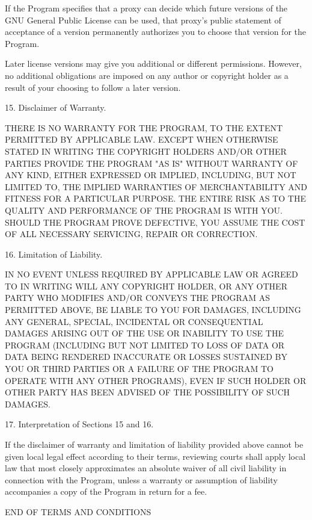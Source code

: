 \documentclass[11pt]{book}
\begin{document}
    If the Program specifies that a proxy can decide which future
    versions of the GNU General Public License can be used, that proxy's
    public statement of acceptance of a version permanently authorizes you
    to choose that version for the Program.

    Later license versions may give you additional or different
    permissions.  However, no additional obligations are imposed on any
    author or copyright holder as a result of your choosing to follow a
    later version.

    15. Disclaimer of Warranty.

    THERE IS NO WARRANTY FOR THE PROGRAM, TO THE EXTENT PERMITTED BY
    APPLICABLE LAW.  EXCEPT WHEN OTHERWISE STATED IN WRITING THE COPYRIGHT
    HOLDERS AND/OR OTHER PARTIES PROVIDE THE PROGRAM "AS IS" WITHOUT WARRANTY
    OF ANY KIND, EITHER EXPRESSED OR IMPLIED, INCLUDING, BUT NOT LIMITED TO,
    THE IMPLIED WARRANTIES OF MERCHANTABILITY AND FITNESS FOR A PARTICULAR
    PURPOSE.  THE ENTIRE RISK AS TO THE QUALITY AND PERFORMANCE OF THE PROGRAM
    IS WITH YOU.  SHOULD THE PROGRAM PROVE DEFECTIVE, YOU ASSUME THE COST OF
    ALL NECESSARY SERVICING, REPAIR OR CORRECTION.

    16. Limitation of Liability.

    IN NO EVENT UNLESS REQUIRED BY APPLICABLE LAW OR AGREED TO IN WRITING
    WILL ANY COPYRIGHT HOLDER, OR ANY OTHER PARTY WHO MODIFIES AND/OR CONVEYS
    THE PROGRAM AS PERMITTED ABOVE, BE LIABLE TO YOU FOR DAMAGES, INCLUDING ANY
    GENERAL, SPECIAL, INCIDENTAL OR CONSEQUENTIAL DAMAGES ARISING OUT OF THE
    USE OR INABILITY TO USE THE PROGRAM (INCLUDING BUT NOT LIMITED TO LOSS OF
    DATA OR DATA BEING RENDERED INACCURATE OR LOSSES SUSTAINED BY YOU OR THIRD
    PARTIES OR A FAILURE OF THE PROGRAM TO OPERATE WITH ANY OTHER PROGRAMS),
    EVEN IF SUCH HOLDER OR OTHER PARTY HAS BEEN ADVISED OF THE POSSIBILITY OF
    SUCH DAMAGES.

    17. Interpretation of Sections 15 and 16.

    If the disclaimer of warranty and limitation of liability provided
    above cannot be given local legal effect according to their terms,
    reviewing courts shall apply local law that most closely approximates
    an absolute waiver of all civil liability in connection with the
    Program, unless a warranty or assumption of liability accompanies a
    copy of the Program in return for a fee.

    END OF TERMS AND CONDITIONS
\end{document}
